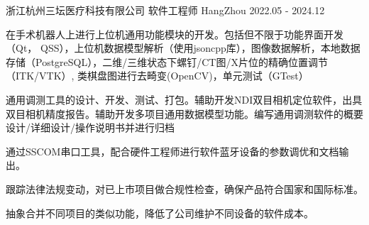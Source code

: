 

\begin{cventries}

  \cventry
    {浙江杭州三坛医疗科技有限公司} %
    {软件工程师} %
    {HangZhou} %
    {2022.05 - 2024.12} %
    {
      \begin{cvitems} %
        \item {在手术机器人上进行上位机通用功能模块的开发。包括但不限于功能界面开发（Qt， QSS），上位机数据模型解析（使用jsoncpp库），图像数据解析，本地数据存储（PostgreSQL），二维/三维状态下螺钉/CT图/X片位的精确位置调节（ITK/VTK）, 类棋盘图进行去畸变(OpenCV)，单元测试（GTest）}
        \item {通用调测工具的设计、开发、测试、打包。辅助开发NDI双目相机定位软件，出具双目相机精度报告。辅助开发多项目通用数据模型功能。编写通用调测软件的概要设计/详细设计/操作说明书并进行归档}
        \item {通过SSCOM串口工具，配合硬件工程师进行软件蓝牙设备的参数调优和文档输出。}
        \item {跟踪法律法规变动，对已上市项目做合规性检查，确保产品符合国家和国际标准。}
        \item {抽象合并不同项目的类似功能，降低了公司维护不同设备的软件成本。}
      \end{cvitems}
    }

\end{cventries}
